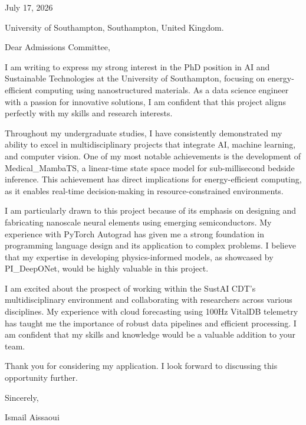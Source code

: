 \documentclass[11pt]{letter}
\begin{document}
\opening{July 17, 2026}

University of Southampton,
Southampton, United Kingdom.

Dear Admissions Committee,

I am writing to express my strong interest in the PhD position in AI and Sustainable Technologies at the University of Southampton, focusing on energy-efficient computing using nanostructured materials. As a data science engineer with a passion for innovative solutions, I am confident that this project aligns perfectly with my skills and research interests.

Throughout my undergraduate studies, I have consistently demonstrated my ability to excel in multidisciplinary projects that integrate AI, machine learning, and computer vision. One of my most notable achievements is the development of Medical_MambaTS, a linear-time state space model for sub-millisecond bedside inference. This achievement has direct implications for energy-efficient computing, as it enables real-time decision-making in resource-constrained environments.

I am particularly drawn to this project because of its emphasis on designing and fabricating nanoscale neural elements using emerging semiconductors. My experience with PyTorch Autograd has given me a strong foundation in programming language design and its application to complex problems. I believe that my expertise in developing physics-informed models, as showcased by PI_DeepONet, would be highly valuable in this project.

I am excited about the prospect of working within the SustAI CDT's multidisciplinary environment and collaborating with researchers across various disciplines. My experience with cloud forecasting using 100Hz VitalDB telemetry has taught me the importance of robust data pipelines and efficient processing. I am confident that my skills and knowledge would be a valuable addition to your team.

Thank you for considering my application. I look forward to discussing this opportunity further.

Sincerely,

Ismail Aissaoui

\closing{}
\end{document}
